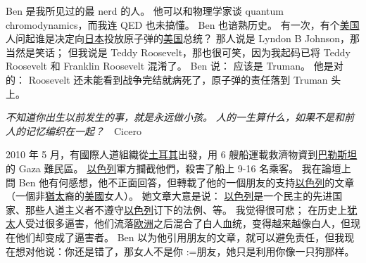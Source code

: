 \documentclass[12pt]{report}
\makeatletter
\newcommand{\tab}{\hspace*{1cm}}
\newcommand{\speechCn}[1]{\textrm{\textit{\textcolor{Speech}{#1}}}}
\renewcommand{\d}[1]{$\underaccent{\scalebox{0.5}{\textbullet}}{\textrm{#1}}$}
\newcommand{\ds}[1]{%
  \@tfor\next:=#1\do{\d{\next}}}
\newcommand*\dashh{\,\,\textemdash\kern-1pt\textemdash\,\,}
\makeatother
\begin{document}
{Ben 是我所见过的最 nerd 的人。 他可以和物理学家谈 quantum chromodynamics，而我连 QED 也未搞懂。 Ben 也谙熟历史。  有一次，有个\uline{美国}人问起谁是决定向\uline{日本}投放原子弹的\uline{美国}总统？  那人说是 Lyndon B Johnson，那当然是笑话； 但我说是  Teddy Roosevelt，那也很可笑，因为我起码已将 Teddy Roosevelt 和 Franklin Roosevelt 混淆了。 Ben 说： 应该是 Truman。  他是对的： Roosevelt 还未能看到战争完结就病死了，原子弹的责任落到 Truman 头上。

\speechCn{不知道你出生以前发生的事，就是永远做小孩。 人的一生算什么，如果不是和前人的记忆编织在一起？} \tab \dashh Cicero

2010 年 5 月，有國際人道組織從\uline{土耳其}出發，用 6 艘船運載救濟物資到\uline{巴勒斯坦}的 Gaza 難民區。 \uline{以色列}軍方攔截他們，殺害了船上 9-16 名乘客。 我在論壇上問 Ben 他有何感想，他不正面回答，但轉載了他的一個朋友的支持\uline{以色列}的文章（一個非\uline{猶太}裔的\uline{美國}女人）。 她文章大意是说： \uline{以色列}是一个民主的先进国家、那些人道主义者不遵守\uline{以色列}订下的法例、等。 我觉得很可悲； 在历史上\uline{犹太}人受过很多逼害，他们流落\uline{欧洲}之后混合了白人血统，变得越来越像白人，但现在他们却变成了逼害者。 Ben 以为他引用朋友的文章，就可以避免责任，但我现在想对他说：你还是错了，那女人不是你\ds{朋友}，她只是利用你像一只狗那样。



}
\end{document}
